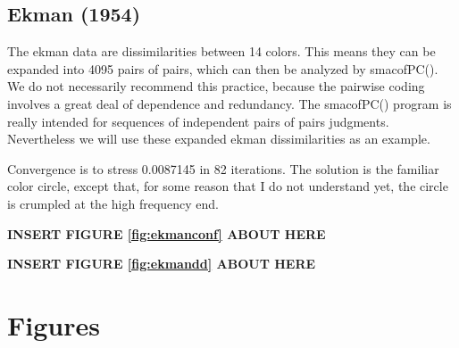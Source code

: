 \documentclass[
  12pt,
]{article}
\begin{document}
\subsection{Ekman (1954)}\label{ekman_54}

The ekman data are dissimilarities between 14 colors. This means they can be
expanded into 4095 pairs of pairs, which can then be
analyzed by smacofPC(). We do not necessarily recommend this practice, because
the pairwise coding involves a great deal of dependence and redundancy.
The smacofPC() program is really intended for sequences of independent pairs of pairs judgments. Nevertheless we will use these expanded ekman dissimilarities as an example.

Convergence is to stress 0.0087145 in 82 iterations. The solution is the
familiar color circle, except that, for some reason that I do not understand yet, the circle is crumpled at the high frequency
end.

\begin{greybox}

\begin{center}
\textbf{INSERT FIGURE \ref{fig:ekmanconf} ABOUT HERE}

\end{center}

\end{greybox}

\begin{greybox}

\begin{center}
\textbf{INSERT FIGURE \ref{fig:ekmandd} ABOUT HERE}

\end{center}

\end{greybox}

\section{Figures}\label{figures}
\end{document}
